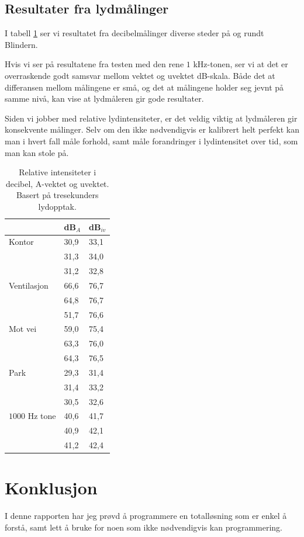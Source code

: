 \documentclass[norsk, twocolumn,letterpaper,11pt,fleqn]{extarticle}
\begin{document}
\subsection{Resultater fra lydmålinger}
\label{sub:reslyd}
I tabell \ref{tab:tab2} ser vi resultatet fra decibelmålinger diverse steder
på og rundt Blindern.

Hvis vi ser på resultatene fra testen med den rene $1$ kHz-tonen,
ser vi at det er overraskende godt samsvar mellom vektet og uvektet dB-skala.
Både det at differansen mellom målingene er små, og det at målingene holder seg
jevnt på samme nivå, kan vise at lydmåleren gir gode resultater.

Siden vi jobber med relative lydintensiteter, er det veldig viktig at
lydmåleren gir konsekvente målinger. Selv om den ikke nødvendigvis er
kalibrert helt perfekt kan man i hvert fall måle forhold, 
samt måle forandringer i lydintensitet over tid, som man kan stole på.
\begin{table}[H]
	\begin{tabular}{l|l|l}
		\hline
		& dB$_A$ & dB$_{iv}$\\
		\hline\hline
		 Kontor & 30,9 & 33,1 \\
		\hline
		 & 31,3 & 34,0\\
		\hline
		 & 31,2 & 32,8 \\
		\hline\hline
		Ventilasjon & 66,6 & 76,7\\
		\hline
		& 64,8 & 76,7 \\
		\hline
		& 51,7 & 76,6 \\
		\hline\hline
		Mot vei & 59,0 & 75,4\\
		\hline
		& 63,3 & 76,0 \\
		\hline
		& 64,3 & 76,5 \\
		\hline\hline
		Park & 29,3 & 31,4\\
		\hline
		& 31,4 & 33,2 \\
		\hline
		& 30,5 & 32,6\\
		\hline
		$1000$ Hz tone & 40,6 & 41,7\\
		\hline
		& 40,9 & 42,1 \\
		\hline
		& 41,2 & 42,4 
	\end{tabular}
	\caption[]{Relative intensiteter i decibel, A-vektet og uvektet. Basert på tresekunders lydopptak.}							
	\label{tab:tab2}
\end{table}

\section{Konklusjon}
\label{sec:disk}
I denne rapporten har jeg prøvd å programmere en totalløsning
som er enkel å forstå, samt lett å bruke for noen som ikke nødvendigvis
kan programmering.
\end{document}
